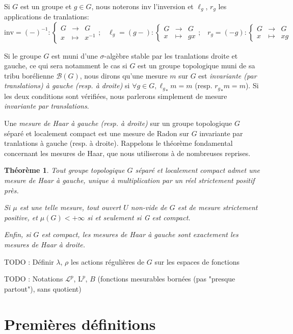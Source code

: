 \documentclass[a4paper,12pt]{article}
\newtheorem{theorem}{Théorème}[section]
\newcommand{\Bor}{\mathcal{B}}
\newcommand\fundef[3]{#1: \left\{\begin{array}{ccc}#2\\#3\end{array}\right.}
\newcommand{\ssi}{si et seulement si }
\newcommand{\inv}{^{-1}}
\newcommand{\blank}{{-}}
\newcommand{\invop}{\mathrm{inv}}
\newcommand{\TODO}[1]{{\color{red}TODO :} #1}
\begin{document}
\paragraph{}
Si $G$ est un groupe et $g\in G$, nous noterons $\invop$ l'inversion et $\ell_g$, $r_g$ les applications de tranlations:
\begin{equation*}
    \fundef{\invop = (\blank)\inv}{G&\to& G}{x&\mapsto& x\inv}\text{;}\quad\fundef{\ell_g=(g\blank)}{G&\to& G}{x&\mapsto& gx}\text{;}\quad\fundef{r_g=(\blank g)}{G&\to& G}{x&\mapsto& xg}
\end{equation*}

Si le groupe $G$ est muni d'une $\sigma$-algèbre stable par les tranlations droite et gauche, ce qui sera notamment le cas
si $G$ est un groupe topologique muni de sa tribu borélienne $\Bor(G)$, nous dirons qu'une mesure $m$ sur $G$ est \textit{invariante
(par translations) à gauche (resp. à droite)} si $\forall g\in G, {\ell_g}_*m = m$ (resp. ${r_g}_*m = m$). Si les deux conditions
sont vérifiées, nous parlerons simplement de mesure \textit{invariante par translations}.

Une \textit{mesure de Haar à gauche (resp. à droite)} sur un groupe topologique $G$ séparé et localement compact est une mesure de
Radon sur $G$ invariante par tranlations à gauche (resp. à droite). Rappelons le théorème fondamental concernant les mesures de Haar, que nous 
utiliserons à de nombreuses reprises.

\begin{theorem}\label{theorem_Haar}
    Tout groupe topologique $G$ séparé et localement compact admet une mesure de Haar à gauche, unique à multiplication par un réel strictement 
    positif près. 
    
    Si $\mu$ est une telle mesure, tout ouvert $U$ non-vide de $G$ est de mesure strictement positive,
    et $\mu(G)<+\infty$ \ssi G est compact.

    Enfin, si $G$ est compact, les mesures de Haar à gauche sont exactement les mesures de Haar à droite.
\end{theorem}

\TODO{Définir $\lambda$, $\rho$ les actions régulières de $G$ sur les espaces de fonctions}

\TODO{Notations $\mathscr{L}^p$, $\mathrm{L}^p$, $B$ (fonctions mesurables bornées (pas "presque partout"), sans quotient)}

\section{Premières définitions}
\end{document}
